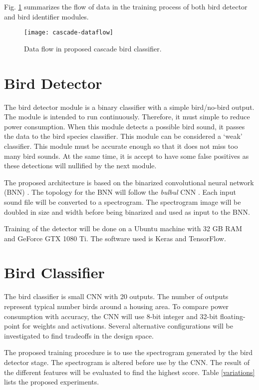 Fig. \ref{cascade-dataflow} summarizes the flow of data in the training process of both bird detector and bird identifier modules.


\begin{figure}%
\centering
\texttt{[image: cascade-dataflow]}
\caption{Data flow in proposed cascade bird classifier.}
\label{cascade-dataflow}
\end{figure}


\FloatBarrier

\section{Bird Detector}

The bird detector module is a binary classifier with a simple bird/no-bird output.
The module is intended to run continuously. Therefore, it must simple to reduce power consumption.
When this module detects a possible bird sound,  it passes the data to the bird species classifier.
This module can be considered a `weak' classifier. 
This module must be accurate enough so that it does not miss too many bird sounds.
At the same time, it is accept to have some false positives as these detections will nullified by the next module.

The proposed architecture is based on the binarized convolutional neural network (BNN)  \cite{Courbariaux2015,Simons2019}.
The topology for the BNN will follow the \textit{bulbul} CNN \cite{Grill2017}.
Each input sound file will be converted to a spectrogram.
The spectrogram image will be doubled in size and width before being binarized and used as input to the BNN.

Training of the detector will be done on a Ubuntu machine with 32 GB RAM and GeForce GTX 1080 Ti.
The software used is Keras and TensorFlow.

\section{Bird Classifier}

The bird classifier is small CNN with 20 outputs.
The number of outputs represent typical number birds around a housing area.
To compare power consumption with accuracy, the CNN will use 8-bit integer and 32-bit floating-point for weights and activations.
Several alternative configurations will be investigated to find tradeoffs in the design space.

The proposed training procedure is to use the spectrogram generated by the bird detector stage.
The spectrogram is altered before use by the CNN.
The result of the different features will be evaluated to find the highest score. Table \ref{variations} lists the proposed experiments.

